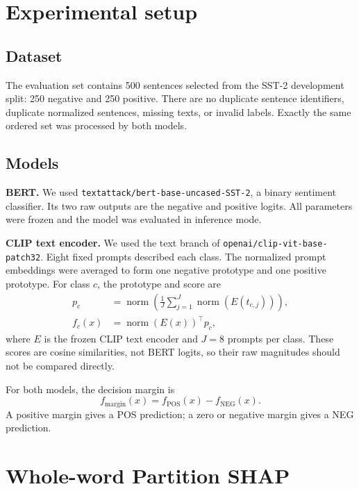\documentclass[11pt,a4paper]{article}
\begin{document}
\section{Experimental setup}

\subsection{Dataset}

The evaluation set contains 500 sentences selected from the SST-2 development split: 250 negative and 250 positive. There are no duplicate sentence identifiers, duplicate normalized sentences, missing texts, or invalid labels. Exactly the same ordered set was processed by both models.

\subsection{Models}

\textbf{BERT.} We used \texttt{textattack/bert-base-uncased-SST-2}, a binary sentiment classifier. Its two raw outputs are the negative and positive logits. All parameters were frozen and the model was evaluated in inference mode.

\textbf{CLIP text encoder.} We used the text branch of \texttt{openai/clip-vit-base-patch32}. Eight fixed prompts described each class. The normalized prompt embeddings were averaged to form one negative prototype and one positive prototype. For class $c$, the prototype and score are
\begin{align}
  p_c &= \operatorname{norm}\!\left(\frac{1}{J}\sum_{j=1}^{J}\operatorname{norm}(E(t_{c,j}))\right),\\
  f_c(x) &= \operatorname{norm}(E(x))^{\top}p_c,
\end{align}
where $E$ is the frozen CLIP text encoder and $J=8$ prompts per class. These scores are cosine similarities, not BERT logits, so their raw magnitudes should not be compared directly.

For both models, the decision margin is
\begin{equation}
  f_{\mathrm{margin}}(x)=f_{\mathrm{POS}}(x)-f_{\mathrm{NEG}}(x).
\end{equation}
A positive margin gives a POS prediction; a zero or negative margin gives a NEG prediction.

\section{Whole-word Partition SHAP}
\end{document}
